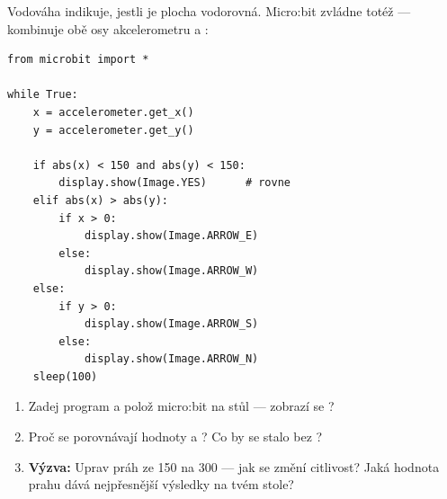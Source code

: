 \begin{bonusukol}

Vodováha indikuje, jestli je plocha vodorovná. Micro:bit zvládne totéž —
kombinuje obě osy akcelerometru a :

\begin{lstlisting}
from microbit import *

while True:
    x = accelerometer.get_x()
    y = accelerometer.get_y()

    if abs(x) < 150 and abs(y) < 150:
        display.show(Image.YES)      # rovne
    elif abs(x) > abs(y):
        if x > 0:
            display.show(Image.ARROW_E)
        else:
            display.show(Image.ARROW_W)
    else:
        if y > 0:
            display.show(Image.ARROW_S)
        else:
            display.show(Image.ARROW_N)
    sleep(100)
\end{lstlisting}

\begin{enumerate}
  \item Zadej program a polož micro:bit na stůl — zobrazí se ?
  \item Proč se porovnávají hodnoty  a ?
        Co by se stalo bez ?
  \item \textbf{Výzva:} Uprav práh ze 150 na 300 — jak se změní citlivost?
        Jaká hodnota prahu dává nejpřesnější výsledky na tvém stole?
\end{enumerate}

\odpoved[2.5cm]

\end{bonusukol}

